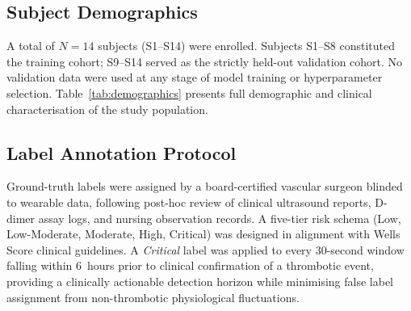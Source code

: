 \documentclass[conference]{IEEEtran}
\begin{document}
\subsection{Subject Demographics}
A total of $N = 14$ subjects (S1--S14) were enrolled.  Subjects S1--S8
constituted the training cohort; S9--S14 served as the strictly
held-out validation cohort.  No validation data were used at any stage
of model training or hyperparameter selection.
Table~\ref{tab:demographics} presents full demographic and clinical
characterisation of the study population.

\begin{table}[h]
\caption{Subject Demographics and Clinical Risk Stratification}
\label{tab:demographics}
\centering
{}
\end{table}

\subsection{Label Annotation Protocol}
Ground-truth labels were assigned by a board-certified vascular surgeon
blinded to wearable data, following post-hoc review of clinical
ultrasound reports, D-dimer assay logs, and nursing observation records.
A five-tier risk schema (Low, Low-Moderate, Moderate, High, Critical)
was designed in alignment with Wells Score clinical guidelines.  A
\textit{Critical} label was applied to every 30-second window falling
within 6~hours prior to clinical confirmation of a thrombotic event,
providing a clinically actionable detection horizon while minimising
false label assignment from non-thrombotic physiological fluctuations.
\end{document}
